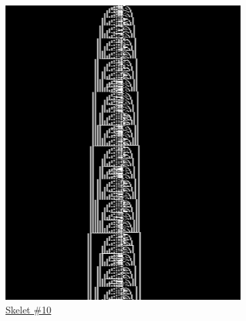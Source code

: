 \begin{figure}[h!]
\begin{minipage}{\textwidth}
\begin{subfigure}{0.3\textwidth}
            \includegraphics[width=\linewidth]{figures/sporadic-machines/sk10.png}
            \caption*{\href{https://bbchallenge.org/1RB0RA_0LC1RA_1RE1LD_1LC0LD_---0RB}{Skelet \#10}}
        \end{subfigure}
        \hfill
        \begin{subfigure}{0.3\textwidth}
            \centering

\end{subfigure}
\end{minipage}
\end{figure}
